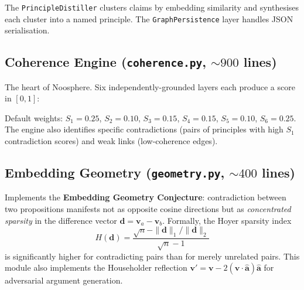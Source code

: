 \documentclass[11pt,letterpaper]{article}
\begin{document}
The \texttt{PrincipleDistiller} clusters claims by embedding similarity and synthesises each cluster into a named principle. The \texttt{GraphPersistence} layer handles JSON serialisation.

\subsection{Coherence Engine (\texttt{coherence.py}, ${\sim}900$ lines)}

The heart of Noosphere. Six independently-grounded layers each produce a score in $[0, 1]$:

\begin{center}
\end{center}

Default weights: $S_1 = 0.25$, $S_2 = 0.10$, $S_3 = 0.15$, $S_4 = 0.15$, $S_5 = 0.10$, $S_6 = 0.25$. The engine also identifies specific contradictions (pairs of principles with high $S_1$ contradiction scores) and weak links (low-coherence edges).

\subsection{Embedding Geometry (\texttt{geometry.py}, ${\sim}400$ lines)}

Implements the \textbf{Embedding Geometry Conjecture}: contradiction between two propositions manifests not as opposite cosine directions but as \emph{concentrated sparsity} in the difference vector $\mathbf{d} = \mathbf{v}_a - \mathbf{v}_b$. Formally, the Hoyer sparsity index
\[
H(\mathbf{d}) = \frac{\sqrt{n} - \|\mathbf{d}\|_1 / \|\mathbf{d}\|_2}{\sqrt{n} - 1}
\]
is significantly higher for contradicting pairs than for merely unrelated pairs. This module also implements the Householder reflection $\mathbf{v}' = \mathbf{v} - 2(\mathbf{v} \cdot \hat{\mathbf{a}})\hat{\mathbf{a}}$ for adversarial argument generation.
\end{document}
